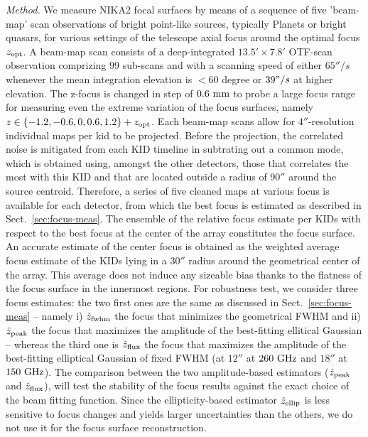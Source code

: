 \emph{Method. } We measure NIKA2 focal surfaces by means of a sequence of five 'beam-map'
scan observations of bright point-like sources, typically Planets or
bright quasars,
for various settings of the telescope axial focus around the
optimal focus $z_{\rm{opt}}$. A beam-map scan consists of a deep-integrated
$13.5' \times 7.8'$ OTF-scan observation comprizing $99$ sub-scans and
with a scanning speed of either $65''/s$ whenever the mean integration
elevation is $< 60$ degree or $39"/s$ at higher elevation. The z-focus is changed in step of
$0.6~\rm{mm}$ to probe a large focus range for measuring even the
extreme variation of the focus surfaces,
namely $z \in \{-1.2, -0.6, 0, 0.6, 1.2 \} + z_{\rm{opt}}$.
Each beam-map scans allow for $4''$-resolution individual maps per kid to
be projected. Before the projection, the correlated noise is mitigated
from each KID timeline in subtrating out a common mode, which is obtained
using, amongst the other detectors, those that correlates the most
with this KID and that are located outside a radius of $90''$
around the source centroid.
Therefore, a series of five cleaned maps at various focus is
available for each detector, from which the best focus is estimated as
described in Sect.~\ref{sec:focus-meas}. The ensemble of the relative
focus estimate per KIDs with respect to the best focus at the center
of the array constitutes the focus surface. An accurate estimate of
the center focus is obtained as the
weighted average focus estimate of the KIDs lying in a $30''$ radius
around the geometrical center of the array. This average does not
induce any sizeable bias thanks to the flatness of the focus surface
in the innermost regions. For robustness test, we consider three focus
estimates: the two first ones are the same as discussed in
Sect.~\ref{sec:focus-meas} -- namely i) $\hat z_{\rm{fwhm}}$ the focus that
minimizes the geometrical FWHM and ii) $\hat z_{\rm{peak}}$ the focus
that maximizes the amplitude of the best-fitting ellitical Gaussian --
whereas the third one is $\hat z_{\rm{flux}}$ the focus that maximizes
the amplitude of the best-fitting elliptical Gaussian of fixed FWHM
(at $12''$ at $260~\rm{GHz}$ and $18''$ at $150~\rm{GHz}$). The 
comparison between the two amplitude-based estimators
($\hat z_{\rm{peak}}$ and $\hat z_{\rm{flux}}$), will test the
stability of the focus results against the exact choice of the beam fitting
function. Since the ellipticity-based estimator $\hat z_{\rm{ellip}}$ is
less sensitive to focus changes and yields larger uncertainties than the
others, we do not use it for the focus surface reconstruction.     


